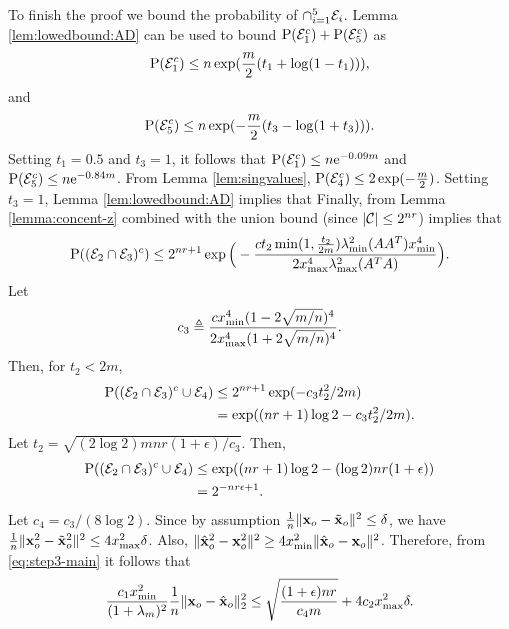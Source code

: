\documentclass[onecolumn]{IEEEtran}
\newcommand{\xvh}{\hat{\xv}}
\newcommand{\xvt}{\tilde{\xv}}
\begin{document}
To finish the proof we bound the probability of $\cap_{i=1}^5 \mathcal{E}_i$.  Lemma \ref{lem:lowedbound:AD} can be used to bound $\operatorname{P}(\mathcal{E}_1^c)+\operatorname{P}(\mathcal{E}_5^c)$ as
\[
\operatorname{P}(\mathcal{E}_1^c)\leq  n \exp(\frac{m}{2} (t_1 + \log (1- t_1))),
\]
and
\[
 \operatorname{P}(\mathcal{E}_5^c)\leq n\exp(-\frac{m}{2} (t_3 - \log (1+ t_3))).
 \]
Setting $t_1=0.5$ and $t_3=1$, it follows that $\operatorname{P}(\mathcal{E}_1^c)\leq n{\rm e}^{-0.09m}$ and $\operatorname{P}(\mathcal{E}_5^c)\leq n{\rm e}^{-0.84m}$. From Lemma \ref{lem:singvalues},  $\operatorname{P}(\mathcal{E}_4^c)\leq 2\exp(-\frac{m}{2})$. Setting $t_3=1$, Lemma \ref {lem:lowedbound:AD} implies that 
Finally, from Lemma  \ref{lemma:concent-z} combined with the union bound (since $|\mathcal{C}|\leq 2^{nr}$) implies that 
\[
\operatorname{P}((\mathcal{E}_2\cap\mathcal{E}_3)^c)\leq  2^{nr+1}\exp\Big(-{ct_2\min(1,{t_2\over 2m  }) \lambda^2_{\min}(AA^T) x^4_{\min} \over 2 x_{\max}^4\lambda^2_{\max}(A^TA)}\Big).
\]
Let
\[
c_3 \triangleq {c x^4_{\min} (1-2\sqrt{m/n})^4 \over 2 x_{\max}^4(1+2\sqrt{m/n})^4}.
\]
Then, for $t_2<2m$,
\begin{align}
\operatorname{P}((\mathcal{E}_2\cap\mathcal{E}_3)^c\cup\mathcal{E}_4)&\leq  2^{nr+1}\exp(-{c_3t_2^2/2m})\nonumber\\
&=\exp((nr+1) \log 2-{c_3t_2^2/2m}).
\end{align}
Let $t_2=\sqrt{(2\log 2)mnr (1+\epsilon)/c_3}$. Then,
\begin{align}
\operatorname{P}((\mathcal{E}_2\cap\mathcal{E}_3)^c\cup\mathcal{E}_4)&\leq \exp((nr+1) \log 2- (\log 2)nr (1+\epsilon))\nonumber\\
&= 2^{-nr \epsilon+1}.
\end{align}
Let $c_4=c_3/(8\log 2)$.  Since by assumption ${1\over n}\|\xv_o-{\xvt_o}\|^2\leq \delta$, we have ${1\over n}\|\xv_o^2-\xvt_o^2\|^2\leq 4x_{\max}^2\delta$. Also, $\|\xvh_o^2-\xv_o^2\|^2\geq 4x_{\min}^2\|\xvh_o-\xv_o\|^2$. Therefore,  from \eqref{eq:step3-main} it follows  that 
\begin{align}
 {c_1x^2_{\min} \over (1+\lambda_{m})^2} {1\over n} \| \xv_o- \xvh_o\|_2^2 \leq   \sqrt{(1+\epsilon) nr  \over c_4 m} +4 c_2 x^2_{\max}\delta.
\end{align}


%
%
\end{document}
